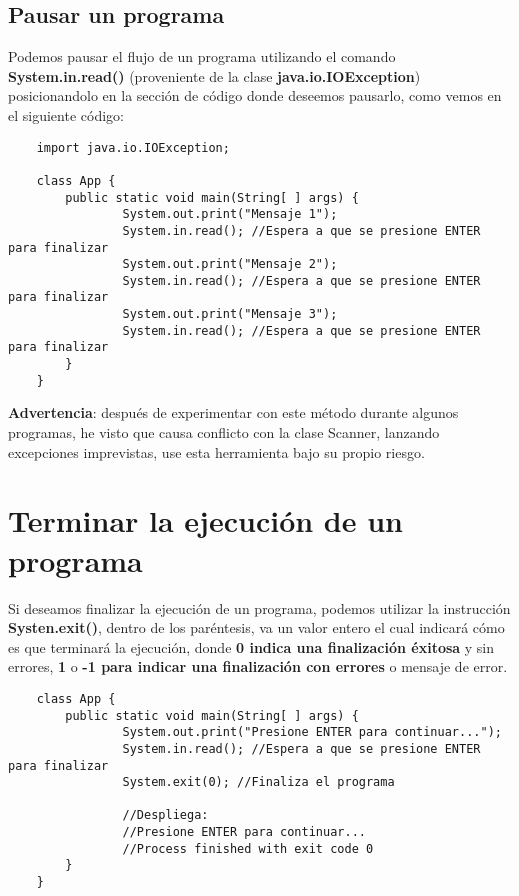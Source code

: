 \subsection{Pausar un programa}
Podemos pausar el flujo de un programa utilizando el comando \textbf{System.in.read()} (proveniente de la clase \textbf{java.io.IOException}) posicionandolo en la sección de código donde deseemos pausarlo, como vemos en el siguiente código:
\begin{lstlisting}
	import java.io.IOException;

    class App {
        public static void main(String[ ] args) {
        		System.out.print("Mensaje 1");
        		System.in.read(); //Espera a que se presione ENTER para finalizar
        		System.out.print("Mensaje 2");
        		System.in.read(); //Espera a que se presione ENTER para finalizar
        		System.out.print("Mensaje 3");
        		System.in.read(); //Espera a que se presione ENTER para finalizar
        }
    }
\end{lstlisting}
\textbf{Advertencia}: después de experimentar con este método durante algunos programas, he visto que causa conflicto con la clase Scanner, lanzando excepciones imprevistas, use esta herramienta bajo su propio riesgo.



\section{Terminar la ejecución de un programa}
Si deseamos finalizar la ejecución de un programa, podemos utilizar la instrucción \textbf{Systen.exit()}, dentro de los paréntesis, va un valor entero el cual indicará cómo es que terminará la ejecución, donde \textbf{0 indica una finalización éxitosa} y sin errores, \textbf{1} o \textbf{-1 para indicar una finalización con errores} o mensaje de error.
\begin{lstlisting}
    class App {
        public static void main(String[ ] args) {
        		System.out.print("Presione ENTER para continuar...");
        		System.in.read(); //Espera a que se presione ENTER para finalizar
        		System.exit(0); //Finaliza el programa
        		
        		//Despliega:
        		//Presione ENTER para continuar...
        		//Process finished with exit code 0
        }
    }
\end{lstlisting}



